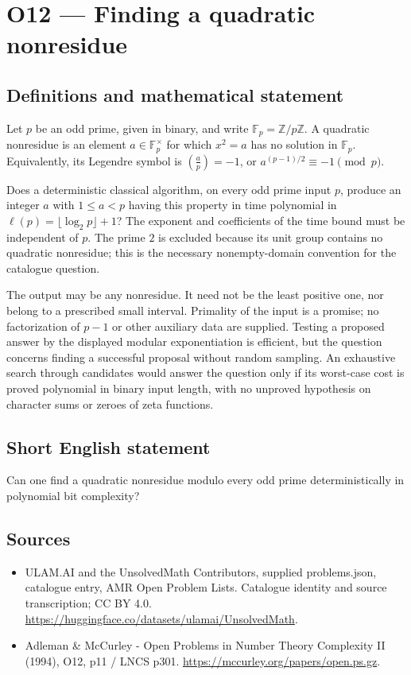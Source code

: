 \documentclass[11pt,a4paper]{article}
\begin{document}
\section*{O12 — Finding a quadratic nonresidue}\label{statement}

\subsection{Definitions and mathematical statement}
Let $p$ be an odd prime, given in binary, and write $\mathbb F_p=\mathbb Z/p\mathbb Z$. A quadratic nonresidue is an element $a\in\mathbb F_p^\times$ for which $x^2=a$ has no solution in $\mathbb F_p$. Equivalently, its Legendre symbol is $\left(\frac ap\right)=-1$, or $a^{(p-1)/2}\equiv-1\pmod p$.

Does a deterministic classical algorithm, on every odd prime input $p$, produce an integer $a$ with $1\le a<p$ having this property in time polynomial in $\ell(p)=\lfloor\log_2p\rfloor+1$? The exponent and coefficients of the time bound must be independent of $p$. The prime $2$ is excluded because its unit group contains no quadratic nonresidue; this is the necessary nonempty-domain convention for the catalogue question.

The output may be any nonresidue. It need not be the least positive one, nor belong to a prescribed small interval. Primality of the input is a promise; no factorization of $p-1$ or other auxiliary data are supplied. Testing a proposed answer by the displayed modular exponentiation is efficient, but the question concerns finding a successful proposal without random sampling. An exhaustive search through candidates would answer the question only if its worst-case cost is proved polynomial in binary input length, with no unproved hypothesis on character sums or zeroes of zeta functions.
\subsection{Short English statement}
Can one find a quadratic nonresidue modulo every odd prime deterministically in polynomial bit complexity?
\subsection{Sources}
\begin{itemize}
\item[S1] ULAM.AI and the UnsolvedMath Contributors, supplied problems.json, catalogue entry, AMR Open Problem Lists. Catalogue identity and source transcription; CC BY 4.0.
\url{https://huggingface.co/datasets/ulamai/UnsolvedMath}.
\item[S2] Adleman \& McCurley - Open Problems in Number Theory Complexity II (1994), O12, p11 / LNCS p301. 
\url{https://mccurley.org/papers/open.ps.gz}.
\end{itemize}
\end{document}
